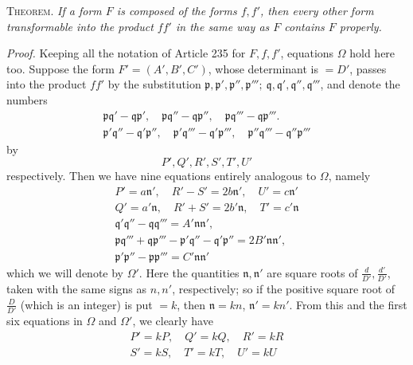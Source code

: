 \textsc{Theorem.} \textit{If a form $F$ is composed of the forms $f,f'$, then every other form transformable into the product $ff'$ in the same way as $F$ contains $F$ properly.}

\textit{Proof.} Keeping all the notation of Article 235 for $F,f,f'$, equations $\Omega$ hold here too. Suppose the form $F'=(A',B',C')$, whose determinant is $=D'$, passes into the product $ff'$ by the substitution $\mathfrak{p},\mathfrak{p}',\mathfrak{p}'',\mathfrak{p}''';\ \mathfrak{q},\mathfrak{q}',\mathfrak{q}'',\mathfrak{q}'''$, and denote the numbers
\[
\begin{gathered}\mathfrak{p}\mathfrak{q}'-\mathfrak{q}\mathfrak{p}',\quad
\mathfrak{p}\mathfrak{q}''-\mathfrak{q}\mathfrak{p}'',\quad
\mathfrak{p}\mathfrak{q}'''-\mathfrak{q}\mathfrak{p}'''.\\
\mathfrak{p}'\mathfrak{q}''-\mathfrak{q}'\mathfrak{p}'',\quad
\mathfrak{p}'\mathfrak{q}'''-\mathfrak{q}'\mathfrak{p}''',\quad
\mathfrak{p}''\mathfrak{q}'''-\mathfrak{q}''\mathfrak{p}'''\end{gathered}
\]
by
\[
P',Q',R',S',T',U'
\]
respectively. Then we have nine equations entirely analogous to $\Omega$, namely
\[
\begin{gathered}
P'=a\mathfrak{n}',\quad R'-S'=2b\mathfrak{n}',\quad U'=c\mathfrak{n}'\\
Q'=a'\mathfrak{n},\quad R'+S'=2b'\mathfrak{n},\quad T'=c'\mathfrak{n}\\
\mathfrak{q}'\mathfrak{q}''-\mathfrak{q}\mathfrak{q}'''=A'\mathfrak{n}\mathfrak{n}',\\
\mathfrak{p}\mathfrak{q}'''+\mathfrak{q}\mathfrak{p}'''-\mathfrak{p}'\mathfrak{q}''-\mathfrak{q}'\mathfrak{p}''=2B'\mathfrak{n}\mathfrak{n}',\\
\mathfrak{p}'\mathfrak{p}''-\mathfrak{p}\mathfrak{p}'''=C'\mathfrak{n}\mathfrak{n}'
\end{gathered}
\]
which we will denote by $\Omega'$. Here the quantities $\mathfrak{n},\mathfrak{n}'$ are square roots of $\frac{d}{D'},\frac{d'}{D'}$, taken with the same signs as $n,n'$, respectively; so if the positive square root of $\frac{D}{D'}$ (which is an integer) is put $=k$, then $\mathfrak{n}=kn$, $\mathfrak{n}'=kn'$. From this and the first six equations in $\Omega$ and $\Omega'$, we clearly have
\[
\begin{gathered}
P'=kP,\quad Q'=kQ,\quad R'=kR\\
S'=kS,\quad T'=kT,\quad U'=kU
\end{gathered}
\]
